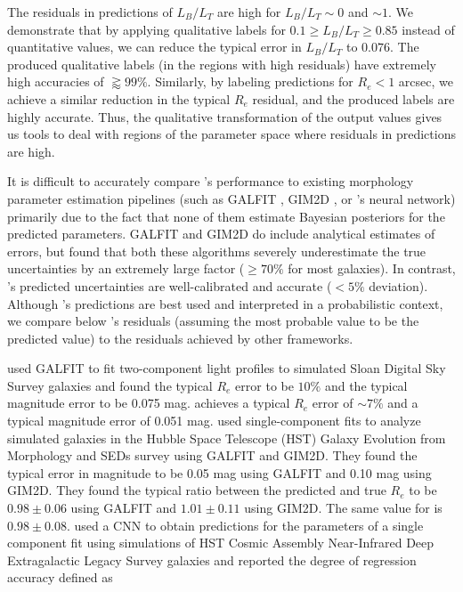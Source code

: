 The residuals in \gampen{} predictions of $L_B/L_T$ are high for $L_B/L_T \sim 0$ and $\sim 1$. We demonstrate that by applying qualitative labels for $0.1 \geq L_B/L_T \geq 0.85$ instead of quantitative values, we can reduce the typical error in $L_B/L_T$ to $0.076$. The produced qualitative labels (in the regions with high residuals) have extremely high accuracies of $\gtrapprox99\%$. Similarly, by labeling predictions for $R_e < 1$ arcsec, we achieve a similar reduction in the typical $R_e$ residual, and the produced labels are highly accurate. Thus, the qualitative transformation of the output values gives us tools to deal with regions of the parameter space where residuals in \gampen{} predictions are high.

It is difficult to accurately compare \gampen{}'s performance to existing morphology parameter estimation pipelines (such as GALFIT \citep{galfit}, GIM2D \citep{gim2d}, or \citet{Tuccillo2018DeepFitting}'s neural network) primarily due to the fact that none of them estimate Bayesian posteriors for the predicted parameters. GALFIT and GIM2D do include analytical estimates of errors, but \citet{haussler_07} found that both these algorithms severely underestimate the true uncertainties by an extremely large factor ($\geq 70\%$ for most galaxies). In contrast, \gampen{}'s predicted uncertainties are well-calibrated and accurate ($<5\%$ deviation). Although \gampen{}'s predictions are best used and interpreted in a probabilistic context, we compare below \gampen{}'s residuals (assuming the most probable value to be the predicted value) to the residuals achieved by other frameworks.

\citet{meert_13} used GALFIT to fit two-component light profiles to simulated Sloan Digital Sky Survey \citep[SDSS; ][]{sdss_tech_summary} galaxies and found the typical $R_e$ error to be $10\%$ and the typical magnitude error to be 0.075 mag. \gampen{} achieves a typical $R_e$ error of $\sim7\%$ and a typical magnitude error of 0.051 mag. \citet{haussler_07} used single-component fits to analyze simulated galaxies in the Hubble Space Telescope (HST) Galaxy Evolution from Morphology and SEDs \citep[GEMS; ][]{gems} survey  using GALFIT and GIM2D. They found the typical error in magnitude to be 0.05 mag using GALFIT and 0.10 mag using GIM2D. They found the typical ratio between the predicted and true $R_e$ to be $0.98\pm0.06$ using GALFIT and $1.01 \pm 0.11$ using GIM2D. The same value for \gampen{} is $0.98\pm0.08$. \citet{Tuccillo2018DeepFitting} used a CNN to obtain predictions for the parameters of a single component \sersic{} fit using simulations of HST Cosmic Assembly Near-Infrared Deep Extragalactic Legacy Survey \citep[CANDELS; ][]{candels_1} galaxies  and reported the degree of regression accuracy defined as

